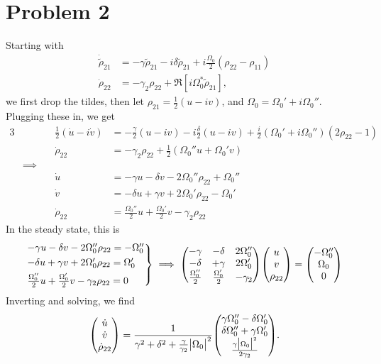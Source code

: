 \documentclass[12pt]{article}
\newcommand{\magsq}[1]{\big|#1\big|^2}
\begin{document}
\section*{Problem 2}
Starting with
\begin{align*}
    \dot{\tilde{\rho}}_{21} &= -\gamma \tilde{\rho}_{21} - i\delta\tilde{\rho}_{21} + i \frac{\Omega_0}{2}\left(\rho_{22}-\rho_{11}\right) \\
    \dot{\rho}_{22} &= -\gamma_2\rho_{22} + \Re[i\Omega_0^*\tilde{\rho}_{21}],
\end{align*}
we first drop the tildes, then let $\rho_{21} = \frac{1}{2}(u - iv)$, and $\Omega_0 = \Omega_0' + i\Omega_0''$. Plugging these in, we get
\begin{alignat*}{3}
    &\quad & \frac{1}{2}(\dot{u} - i\dot{v}) &= -\frac{\gamma}{2}(u-iv) - i\frac{\delta}{2}(u-iv) + \frac{i}{2}\left(\Omega_0' + i\Omega_0''\right)\left(2\rho_{22} - 1\right) \\
    &\quad & \dot{\rho}_{22} &= -\gamma_2\rho_{22} + \frac{1}{2}\left(\Omega_0'' u + \Omega_0' v\right) \\
    &\implies\quad & &  \\
    &\quad & \dot{u} &= -\gamma u - \delta v - 2\Omega_0''\rho_{22} + \Omega_0'' \\
    &\quad & \dot{v} &= -\delta u + \gamma v + 2\Omega_0' \rho_{22} - \Omega_0'  \\
    &\quad & \dot{\rho}_{22} &= \frac{\Omega_0''}{2} u + \frac{\Omega_0'}{2}v - \gamma_2\rho_{22}
\end{alignat*}
In the steady state, this is   
\[
\begin{rcases*}
    -\gamma u -\delta v - 2\Omega_0''\rho_{22} = -\Omega_0'' \\
    -\delta u + \gamma v + 2\Omega_0'\rho_{22} = \Omega_0' \\
    \frac{\Omega_0''}{2} u + \frac{\Omega_0'}{2} v - \gamma_2\rho_{22} = 0
\end{rcases*}
\implies
\mqty(-\gamma&-\delta&2\Omega_0''\\-\delta&+\gamma&2\Omega_0'\\\frac{\Omega_0''}{2}&\frac{\Omega_0'}{2}&-\gamma_2)\mqty(u\\v\\\rho_{22}) = \mqty(-\Omega_0''\\\Omega_0\\0)
\]
Inverting and solving, we find
\[ \mqty(\dot{u}\\\dot{v}\\\dot{\rho}_{22}) = \frac{1}{\gamma^2 + \delta^2 + \frac{\gamma}{\gamma_2}\magsq{\Omega_0}}\mqty(\gamma\Omega_0'' - \delta\Omega_0' \\ \delta\Omega_0'' + \gamma\Omega_0' \\ \frac{\gamma\magsq{\Omega_0}}{2\gamma_2}). \]
\end{document}
